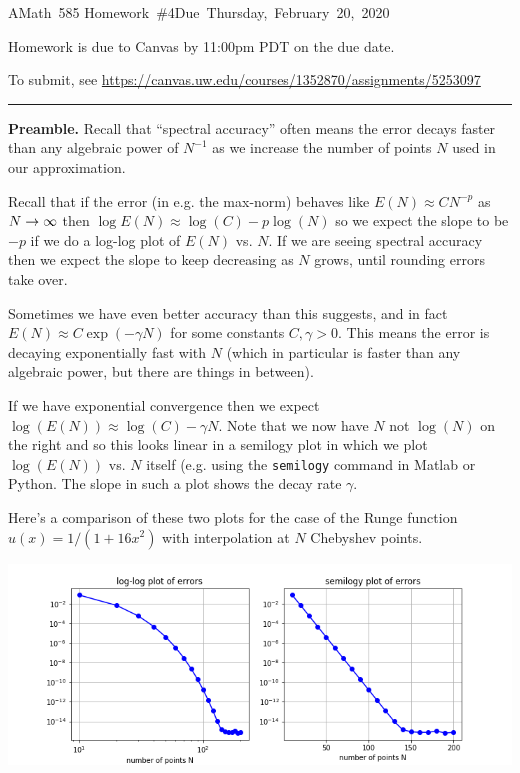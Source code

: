 \documentclass[10pt]{article}
\begin{document}
\hfill\vbox{\hbox{AMath 585}
\hbox{Homework \#4}\hbox{Due Thursday, February 20, 2020}}

\vskip 5pt

Homework is due to Canvas by 11:00pm PDT on the due date.

To submit, see
\url{https://canvas.uw.edu/courses/1352870/assignments/5253097}





\vskip 1cm
\hrule
{\bf Preamble.}
Recall that ``spectral accuracy'' often means the error decays faster than
any algebraic power of $N^{-1}$ as we increase
the number of points $N$ used in our approximation.

Recall that if the error (in e.g. the max-norm) behaves like 
$E(N) \approx C N^{-p}$
as $N \rightarrow \infty$ then $\log E(N) \approx \log(C) - p\log(N)$ so we expect
the slope to be $-p$ if we do a log-log plot of $E(N)$ vs. $N$.
If we are seeing spectral accuracy then we expect the slope to keep
decreasing as $N$ grows, until rounding errors take over.

Sometimes we have even better accuracy than this suggests, and in fact 
$E(N) \approx C \exp(-\gamma N)$ for some constants $C, \gamma > 0$.  This
means the error is decaying exponentially fast with $N$ (which in particular
is faster than any algebraic power, but there are things in between).

If we have exponential convergence then we expect $\log(E(N)) \approx
\log(C) -\gamma N$.  Note that we now have $N$ not $\log(N)$ on the right
and so this looks linear in a semilogy plot in which we plot $\log(E(N))$
vs. $N$ itself (e.g. using the {\tt semilogy} command in Matlab or Python.
The slope in such a plot shows the decay rate $\gamma$.  

Here's a comparison of these two plots for the case of the Runge function
$u(x) = 1/(1 + 16x^2)$ with interpolation at $N$ Chebyshev points.

\hfil\includegraphics[width=5.5in]{RungeErrors.png}\hfil
\end{document}

